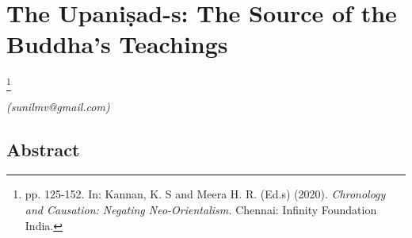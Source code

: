 
\chapter{The Upaniṣad-s: The Source of the Buddha’s Teachings}\label{chapter4}

\footnote{pp. 125-152. In: Kannan, K. S and Meera H. R. (Ed.s) (2020). \textit{Chronology and Causation: Negating Neo-Orientalism.} Chennai: Infinity Foundation India.}

\begin{flushright}
\textit{(sunilmv@gmail.com)}
\end{flushright}

\setcounter{endnote}{0}

\section*{Abstract}

